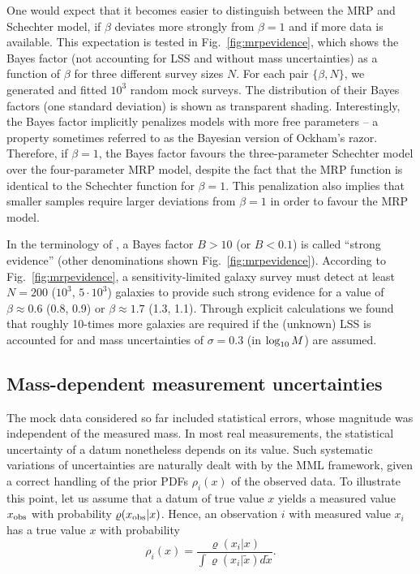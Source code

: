 \documentclass[a4paper,fleqn,usenatbib]{mnras}
\newcommand{\be}{\begin{equation}}
\newcommand{\ee}{\end{equation}}
\newcommand{\fig}[1]{Fig.~\ref{fig:#1}}
\begin{document}
One would expect that it becomes easier to distinguish between the MRP and Schechter model, if $\beta$ deviates more strongly from $\beta=1$ and if  more data is available. This expectation is tested in \fig{mrpevidence}, which shows the Bayes factor (not accounting for LSS and without mass uncertainties) as a function of $\beta$ for three different survey sizes $N$. For each pair $\{\beta,N\}$, we generated and fitted $10^3$ random mock surveys. The distribution of their Bayes factors (one standard deviation) is shown as transparent shading. Interestingly, the Bayes factor implicitly penalizes models with more free parameters -- a property sometimes referred to as the Bayesian version of Ockham's razor. Therefore, if $\beta=1$, the Bayes factor favours the three-parameter Schechter model over the four-parameter MRP model, despite the fact that the MRP function is identical to the Schechter function for $\beta=1$. This penalization also implies that smaller samples require larger deviations from $\beta=1$ in order to favour the MRP model.

In the terminology of \cite{Kass1995}, a Bayes factor $B>10$ (or $B<0.1$) is called ``strong evidence'' (other denominations shown \fig{mrpevidence}). According to \fig{mrpevidence}, a sensitivity-limited galaxy survey must detect at least $N=200$ ($10^3$, $5\cdot10^3$) galaxies to provide such strong evidence for a value of $\beta\approx0.6$ (0.8, 0.9) or $\beta\approx1.7$ (1.3, 1.1). Through explicit calculations we found that roughly 10-times more galaxies are required if the (unknown) LSS is accounted for and mass uncertainties of $\sigma=0.3$ (in $\log_{\rm 10}M$) are assumed. %

\subsection{Mass-dependent measurement uncertainties}\label{ss:varsigma}

The mock data considered so far included statistical errors, whose magnitude was independent of the measured mass. In most real measurements, the statistical uncertainty of a datum nonetheless depends on its value. Such systematic variations of uncertainties are naturally dealt with by the MML framework, given a correct handling of the prior PDFs $\rho_i(x)$ of the observed data. To illustrate this point, let us assume that a datum of true value $x$ yields a measured value $x_{\rm obs}$ with probability $\varrho(x_{\rm obs}|x)$. Hence, an observation $i$ with measured value $x_i$ has a true value $x$ with probability
%
\be\label{eq:rhoderived}
	\rho_i(x) = \frac{\varrho(x_i|x)}{\int\varrho(x_i|\tilde x)d\tilde x}.
\ee
\end{document}
